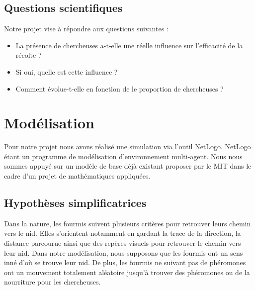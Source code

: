 \documentclass{article}
\begin{document}
\subsection{Questions scientifiques}
Notre projet vise à répondre aux questions suivantes :
\begin{itemize}
\item La présence de chercheuses a-t-elle une réelle influence sur l'efficacité de la récolte ?
\item Si oui, quelle est cette influence ?
\item Comment évolue-t-elle en fonction de le proportion de chercheuses ? 
\end{itemize}
\section{Modélisation}
Pour notre projet nous avons réalisé une simulation via l'outil NetLogo. NetLogo étant un programme de modélisation d'environnement multi-agent. Nous nous sommes appuyé sur un modèle de base déjà existant proposer par le MIT dans le cadre d'un projet de mathématiques appliquées.

\subsection{Hypothèses simplificatrices}
Dans la nature, les fourmis suivent plusieurs critères pour retrouver leurs chemin vers le nid. Elles s'orientent notamment en gardant la trace de la direction, la distance parcourue ainsi que des repères visuels pour retrouver le chemin vers leur nid. Dans notre modélisation, nous supposons que les fourmis ont un sens inné d'où se trouve leur nid. De plus, les fourmis ne suivant pas de phéromones ont un mouvement totalement aléatoire jusqu'à trouver des phéromones ou de la nourriture pour les chercheuses.
\end{document}
